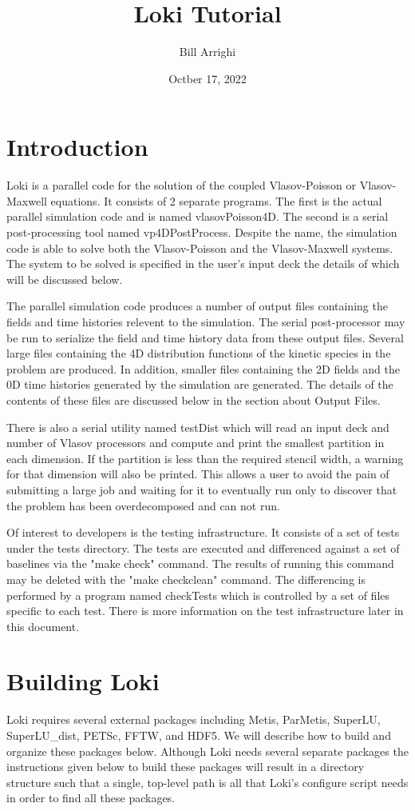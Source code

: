 \documentclass[11pt]{amsart}
\title{Loki Tutorial}
\author{Bill Arrighi}
\date{Octber 17, 2022}
\begin{document}
\maketitle
\section*{Introduction}
Loki is a parallel code for the solution of the coupled Vlasov-Poisson or
Vlasov-Maxwell equations.  It consists of 2 separate programs.  The first is
the actual parallel simulation code and is named vlasovPoisson4D.  The
second is a serial post-processing tool named vp4DPostProcess.  Despite the
name, the simulation code is able to solve both the Vlasov-Poisson and the
Vlasov-Maxwell systems.  The system to be solved is specified in the user's
input deck the details of which will be discussed below.

The parallel simulation code produces a number of output files containing the
fields and time histories relevent to the simulation.  The serial
post-processor may be run to serialize the field and time history data from
these output files.  Several large files containing the 4D distribution
functions of the kinetic species in the problem are produced.  In addition,
smaller files containing the 2D fields and the 0D time histories generated by
the simulation are generated.  The details of the contents of these files are
discussed below in the section about Output Files.

There is also a serial utility named testDist which will read an input deck and
number of Vlasov processors and compute and print the smallest partition in each
dimension.  If the partition is less than the required stencil width, a warning
for that dimension will also be printed.  This allows a user to avoid the pain
of submitting a large job and waiting for it to eventually run only to discover
that the problem has been overdecomposed and can not run.

Of interest to developers is the testing infrastructure.  It consists of a set
of tests under the tests directory.  The tests are executed and differenced
against a set of baselines via the "make check" command.  The results of running
this command may be deleted with the "make checkclean" command.  The
differencing is performed by a program named checkTests which is controlled by
a set of files specific to each test.  There is more information on the test
infrastructure later in this document.

\section*{Building Loki}
Loki requires several external packages including Metis, ParMetis, SuperLU, \\
SuperLU\_dist, PETSc, FFTW, and HDF5.  We will describe how to build and
organize these packages below.  Although Loki needs several separate packages
the instructions given below to build these packages will result in a directory
structure such that a single, top-level path is all that Loki's configure script
needs in order to find all these packages.
\end{document}
